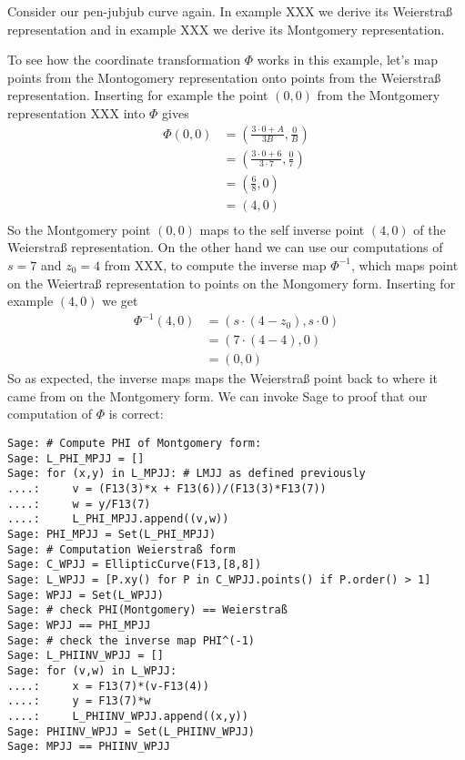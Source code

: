\begin{example} Consider our pen-jubjub curve again. In example XXX we derive its Weierstraß representation and in example XXX we derive its Montgomery representation. 

To see how the coordinate transformation $\Phi$ works in this example, let's map points from the Montogomery representation onto points from the Weierstraß representation. Inserting for example the point $(0,0)$ from the Montgomery representation XXX into $\Phi$ gives
\begin{align*}
\Phi(0,0) & = \left(\frac{3\cdot 0 + A}{3B}, \frac{0}{B}\right) \\
          & = \left(\frac{3\cdot 0 + 6}{3\cdot 7}, \frac{0}{7}\right) \\
          & = \left(\frac{6}{8}, 0\right) \\
          & = \left(4, 0\right) \\
\end{align*}
So the Montgomery point $(0,0)$ maps to the self inverse point $(4,0)$ of the Weierstraß representation. On the other hand we can use our computations of $s=7$ and $z_0=4$ from XXX, to compute the inverse map $\Phi^{-1}$, which maps point on the Weiertraß representation to points on the Mongomery form. Inserting for example $(4,0)$ we get
\begin{align*}
\Phi^{-1}(4,0) & = \left(s\cdot(4-z_0), s\cdot 0\right)\\
               & = \left(7\cdot(4-4), 0\right)\\
               & = (0,0)
\end{align*}
So as expected, the inverse maps maps the Weierstraß point back to where it came from on the Montgomery form. We can invoke Sage to proof that our computation of $\Phi$ is correct:
\begin{verbatim}
Sage: # Compute PHI of Montgomery form:
Sage: L_PHI_MPJJ = []
Sage: for (x,y) in L_MPJJ: # LMJJ as defined previously                                   
....:     v = (F13(3)*x + F13(6))/(F13(3)*F13(7))
....:     w = y/F13(7)
....:     L_PHI_MPJJ.append((v,w))
Sage: PHI_MPJJ = Set(L_PHI_MPJJ)
Sage: # Computation Weierstraß form
Sage: C_WPJJ = EllipticCurve(F13,[8,8]) 
Sage: L_WPJJ = [P.xy() for P in C_WPJJ.points() if P.order() > 1]
Sage: WPJJ = Set(L_WPJJ)
Sage: # check PHI(Montgomery) == Weierstraß
Sage: WPJJ == PHI_MPJJ
Sage: # check the inverse map PHI^(-1)
Sage: L_PHIINV_WPJJ = []
Sage: for (v,w) in L_WPJJ:
....:     x = F13(7)*(v-F13(4))
....:     y = F13(7)*w
....:     L_PHIINV_WPJJ.append((x,y))
Sage: PHIINV_WPJJ = Set(L_PHIINV_WPJJ)
Sage: MPJJ == PHIINV_WPJJ
\end{verbatim}
\end{example}

